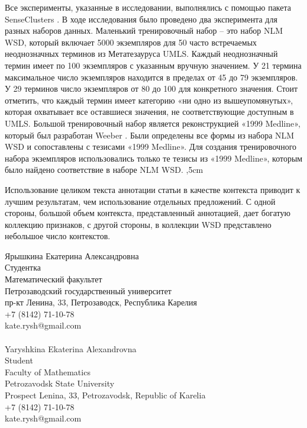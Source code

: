 \documentclass[12pt]{article}
\begin{document}
Все эксперименты, указанные в исследовании, выполнялись с помощью пакета SenseClusters \cite{SC:website}. В ходе исследования было проведено два эксперимента для разных наборов данных. Маленький тренировочный набор -- это набор NLM WSD, который включает 5000 экземпляров для 50 часто встречаемых неоднозначных терминов из Метатезауруса UMLS. Каждый неоднозначный термин имеет по 100 экземпляров с указанным вручную значением. У 21 термина максимальное число экземпляров находится в пределах от 45 до 79 экземпляров. У 29 терминов число экземпляров от 80 до 100 для  конкретного значения. Стоит отметить, что каждый термин имеет категорию «ни одно из вышеупомянутых», которая охватывает все оставшиеся значения, не соответствующие доступным в UMLS. Большой тренировочный набор является реконструкцией «1999 Medline», который был разработан Weeber \cite{Weeber}. Были определены все формы из набора NLM WSD и сопоставлены с тезисами «1999 Medline». Для создания тренировочного набора экземпляров использовались только те тезисы из «1999 Medline», которым было найдено соответствие в наборе NLM WSD.
,5cm

Использование целиком текста аннотации статьи в качестве контекста приводит к лучшим результатам, чем использование отдельных предложений. С одной стороны, большой объем контекста, представленный аннотацией, дает богатую коллекцию признаков, с другой стороны, в коллекции WSD представлено небольшое число контекстов.

 
Ярышкина Екатерина Александровна\\
Студентка\\
Математический факультет\\
Петрозаводский государственный университет\\
пр-кт Ленина, 33, Петрозаводск, Республика Карелия\\
+7 (8142) 71-10-78\\
kate.rysh@gmail.com\\
 \\
Yaryshkina Ekaterina Alexandrovna\\
Student\\
Faculty of Mathematics\\
Petrozavodsk State University\\
Prospect Lenina, 33, Petrozavodsk, Republic of Karelia\\
+7 (8142) 71-10-78\\
kate.rysh@gmail.com  
\end{document}
